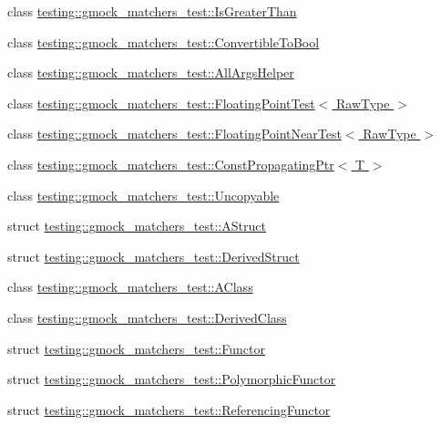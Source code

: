 \begin{DoxyCompactItemize}
\item 
class \hyperlink{classtesting_1_1gmock__matchers__test_1_1IsGreaterThan}{testing\+::gmock\+\_\+matchers\+\_\+test\+::\+Is\+Greater\+Than}
\item 
class \hyperlink{classtesting_1_1gmock__matchers__test_1_1ConvertibleToBool}{testing\+::gmock\+\_\+matchers\+\_\+test\+::\+Convertible\+To\+Bool}
\item 
class \hyperlink{classtesting_1_1gmock__matchers__test_1_1AllArgsHelper}{testing\+::gmock\+\_\+matchers\+\_\+test\+::\+All\+Args\+Helper}
\item 
class \hyperlink{classtesting_1_1gmock__matchers__test_1_1FloatingPointTest}{testing\+::gmock\+\_\+matchers\+\_\+test\+::\+Floating\+Point\+Test$<$ Raw\+Type $>$}
\item 
class \hyperlink{classtesting_1_1gmock__matchers__test_1_1FloatingPointNearTest}{testing\+::gmock\+\_\+matchers\+\_\+test\+::\+Floating\+Point\+Near\+Test$<$ Raw\+Type $>$}
\item 
class \hyperlink{classtesting_1_1gmock__matchers__test_1_1ConstPropagatingPtr}{testing\+::gmock\+\_\+matchers\+\_\+test\+::\+Const\+Propagating\+Ptr$<$ T $>$}
\item 
class \hyperlink{classtesting_1_1gmock__matchers__test_1_1Uncopyable}{testing\+::gmock\+\_\+matchers\+\_\+test\+::\+Uncopyable}
\item 
struct \hyperlink{structtesting_1_1gmock__matchers__test_1_1AStruct}{testing\+::gmock\+\_\+matchers\+\_\+test\+::\+A\+Struct}
\item 
struct \hyperlink{structtesting_1_1gmock__matchers__test_1_1DerivedStruct}{testing\+::gmock\+\_\+matchers\+\_\+test\+::\+Derived\+Struct}
\item 
class \hyperlink{classtesting_1_1gmock__matchers__test_1_1AClass}{testing\+::gmock\+\_\+matchers\+\_\+test\+::\+A\+Class}
\item 
class \hyperlink{classtesting_1_1gmock__matchers__test_1_1DerivedClass}{testing\+::gmock\+\_\+matchers\+\_\+test\+::\+Derived\+Class}
\item 
struct \hyperlink{structtesting_1_1gmock__matchers__test_1_1Functor}{testing\+::gmock\+\_\+matchers\+\_\+test\+::\+Functor}
\item 
struct \hyperlink{structtesting_1_1gmock__matchers__test_1_1PolymorphicFunctor}{testing\+::gmock\+\_\+matchers\+\_\+test\+::\+Polymorphic\+Functor}
\item 
struct \hyperlink{structtesting_1_1gmock__matchers__test_1_1ReferencingFunctor}{testing\+::gmock\+\_\+matchers\+\_\+test\+::\+Referencing\+Functor}

\end{DoxyCompactItemize}
